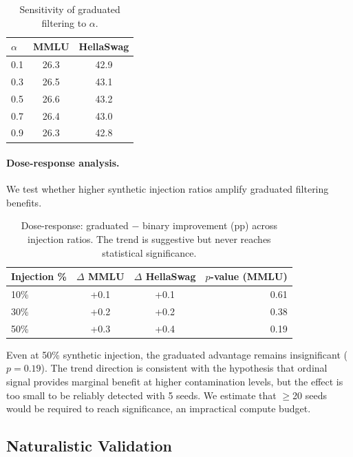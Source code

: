\documentclass[11pt]{article}
\begin{document}
\begin{table}[h]
\centering
\caption{Sensitivity of graduated filtering to $\alpha$.}
\label{tab:alpha}
\begin{tabular}{lcc}
\toprule
$\alpha$ & MMLU & HellaSwag \\
\midrule
0.1 & 26.3 & 42.9 \\
0.3 & 26.5 & 43.1 \\
0.5 & 26.6 & 43.2 \\
0.7 & 26.4 & 43.0 \\
0.9 & 26.3 & 42.8 \\
\bottomrule
\end{tabular}
\end{table}

\paragraph{Dose-response analysis.} We test whether higher synthetic injection ratios amplify graduated filtering benefits.

\begin{table}[h]
\centering
\caption{Dose-response: graduated $-$ binary improvement (pp) across injection ratios. The trend is suggestive but never reaches statistical significance.}
\label{tab:dose}
\begin{tabular}{lccr}
\toprule
Injection \% & $\Delta$ MMLU & $\Delta$ HellaSwag & $p$-value (MMLU) \\
\midrule
10\% & +0.1 & +0.1 & 0.61 \\
30\% & +0.2 & +0.2 & 0.38 \\
50\% & +0.3 & +0.4 & 0.19 \\
\bottomrule
\end{tabular}
\end{table}

Even at 50\% synthetic injection, the graduated advantage remains insignificant ($p = 0.19$). The trend direction is consistent with the hypothesis that ordinal signal provides marginal benefit at higher contamination levels, but the effect is too small to be reliably detected with 5 seeds. We estimate that $\geq$20 seeds would be required to reach significance, an impractical compute budget.

\subsection{Naturalistic Validation}
\label{sec:naturalistic}
\end{document}
